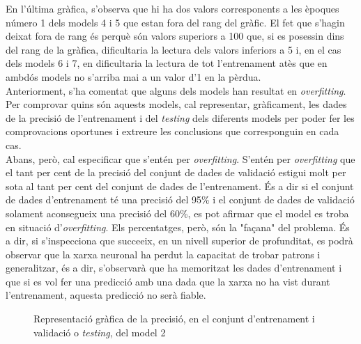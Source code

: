 \documentclass[a4paper,12pt]{article}
\begin{document}
En l'última gràfica, s'observa que hi ha dos valors corresponents a les èpoques número 1 dels models 4 i 5 que estan fora del rang del gràfic. El fet que s'hagin deixat fora de rang és perquè són valors superiors a 100 que, si es posessin dins del rang de la gràfica, dificultaria la lectura dels valors inferiors a 5 i, en el cas dels models 6 i 7, en dificultaria la lectura de tot l'entrenament atès que en ambdós models no s'arriba mai a un valor d'1 en la pèrdua.\\
Anteriorment, s'ha comentat que alguns dels models han resultat en \textit{overfitting}. Per comprovar quins són aquests models, cal representar, gràficament, les dades de la precisió de l'entrenament i del \textit{testing} dels diferents models per poder fer les comprovacions oportunes i extreure les conclusions que corresponguin en cada cas.\\
Abans, però, cal especificar que s'entén per \textit{overfitting}. S'entén per \textit{overfitting} que el tant per cent de la precisió del conjunt de dades de validació estigui molt per sota al tant per cent del conjunt de dades de l'entrenament. És a dir si el conjunt de dades d'entrenament té una precisió del 95\% i el conjunt de dades de validació solament aconsegueix una precisió del 60\%, es pot afirmar que el model es troba en situació d'\textit{overfitting}. Els percentatges, però, són la "façana" del problema. És a dir, si s'inspecciona que succeeix, en un nivell superior de profunditat, es podrà observar que la xarxa neuronal ha perdut la capacitat de trobar patrons i generalitzar, és a dir, s'observarà que ha memoritzat les dades d'entrenament i que si es vol fer una predicció amb una dada que la xarxa no ha vist durant l'entrenament, aquesta predicció no serà fiable.
\begin{figure}[H]
    \centering
    \caption{Representació gràfica de la precisió, en el conjunt d'entrenament i validació o \textit{testing}, del model 2}
    \label{fig:model2}
\end{figure}
\end{document}
